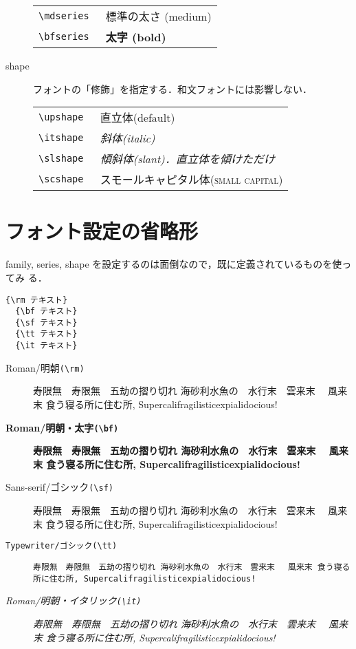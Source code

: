 \documentclass[12pt,a4paper]{ltjsarticle}
\newcommand{\jugem}{寿限無　寿限無　五劫の摺り切れ 海砂利水魚の　水行末　雲来末　
  風来末 食う寝る所に住む所, Supercalifragilisticexpialidocious!}
\begin{document}
\begin{description}
\begin{table}[h]
    \begin{tabular}{rl}
      \hline
      \tt{\textbackslash{}mdseries} & {\mdseries 標準の太さ (medium)}\\
      \tt{\textbackslash{}bfseries} & {\bfseries 太字 (bold)}\\
      \hline
    \end{tabular}
  \end{table}
\item[shape] フォントの「修飾」を指定する．和文フォントには影響しない．
  \begin{table}[h]
    \centering
    \begin{tabular}{rl}
      \hline
      \tt{\textbackslash{}upshape} & {\upshape 直立体(default)}\\
      \tt{\textbackslash{}itshape} & {\itshape 斜体(italic)}\\
      \tt{\textbackslash{}slshape} & {\slshape 傾斜体(slant)．直立体を傾けただけ}\\
      \tt{\textbackslash{}scshape} & {\scshape スモールキャピタル体(small
        capital)}\\
      \hline
    \end{tabular}
  \end{table}
\end{description}
\section{フォント設定の省略形}
family, series, shape を設定するのは面倒なので，既に定義されているものを使ってみ
る．
\begin{lstlisting}[frame=single]
  {\rm テキスト}
  {\bf テキスト}
  {\sf テキスト}
  {\tt テキスト}
  {\it テキスト}
\end{lstlisting}
\begin{description}
\item [\rm Roman/明朝\tt{(\textbackslash{}rm)}] {\rm \jugem}
\item [\bf Roman/明朝・太字\tt{(\textbackslash{}bf)}] {\bf \jugem}
\item [\sf Sans-serif/ゴシック\tt{(\textbackslash{}sf)}] {\sf \jugem}
\item [\tt Typewriter/ゴシック\tt{(\textbackslash{}tt)}] {\tt \jugem}
\item [\it Roman/明朝・イタリック\tt{(\textbackslash{}it)}] {\it \jugem}
\end{description}
\end{document}
